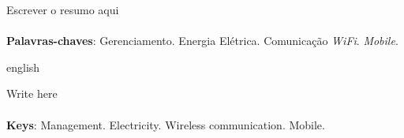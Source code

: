 \begin{resumo}

Escrever o resumo aqui\\\\

\vspace{\onelineskip}
\noindent\textbf{Palavras-chaves}: Gerenciamento. Energia Elétrica. Comunicação \textit{WiFi}. \textit{Mobile}.
\end{resumo}

\begin{resumo}[Abstract]
\begin{otherlanguage*}{english}

Write here\\\\
\vspace{\onelineskip}
\noindent\textbf{Keys}: Management. Electricity. Wireless communication. Mobile.

\end{otherlanguage*}
\end{resumo}